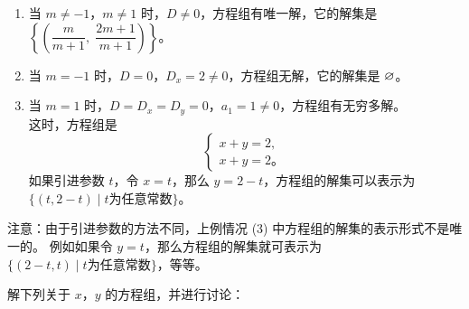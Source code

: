 \begin{enumerate}[(1), nosep]
    \item 当 $m \neq -1$，$m \neq 1$ 时，$D \neq 0$，方程组有唯一解，它的解集是 $\left\{ \left( \dfrac{m}{m+1}, \; \dfrac{2m+1}{m+1} \right) \right\}$。
    \item 当 $m = -1$ 时，$D = 0$，$D_x = 2 \neq 0$，方程组无解，它的解集是 $\varnothing$。
    \item 当 $m = 1$ 时，$D = D_x = D_y = 0$，$a_1 = 1 \neq 0$，方程组有无穷多解。\\
          这时，方程组是
          $$\begin{cases}
              x + y = 2, \\
              x + y = 2 \text{。}
          \end{cases}$$
          如果引进参数 $t$，令 $x = t$，那么  $y = 2 - t$，方程组的解集可以表示为 $\{ (t, 2 - t) \mid  t \text{为任意常数} \}$。
\end{enumerate}

注意：由于引进参数的方法不同，上例情况 (3) 中方程组的解集的表示形式不是唯一的。
例如如果令 $y = t$，那么方程组的解集就可表示为 $\{ (2 - t, t) \mid  t \text{为任意常数} \}$，等等。

\lianxi

解下列关于 $x$，$y$ 的方程组，并进行讨论：

\begin{xiaoxiaotis}


\end{xiaoxiaotis}

